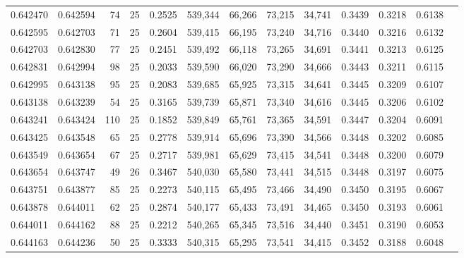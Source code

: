 \begin{tabular}{rrrrrrrrrrrrr}
0.642470 & 0.642594 &    74 &  25 &                                     0.2525 & 539,344 &  66,266 &  73,215 &  34,741 & 0.3439 & 0.3218 & 0.6138 \\
0.642595 & 0.642703 &    71 &  25 &                                     0.2604 & 539,415 &  66,195 &  73,240 &  34,716 & 0.3440 & 0.3216 & 0.6132 \\
0.642703 & 0.642830 &    77 &  25 &                                     0.2451 & 539,492 &  66,118 &  73,265 &  34,691 & 0.3441 & 0.3213 & 0.6125 \\
0.642831 & 0.642994 &    98 &  25 &                                     0.2033 & 539,590 &  66,020 &  73,290 &  34,666 & 0.3443 & 0.3211 & 0.6115 \\
0.642995 & 0.643138 &    95 &  25 &                                     0.2083 & 539,685 &  65,925 &  73,315 &  34,641 & 0.3445 & 0.3209 & 0.6107 \\
0.643138 & 0.643239 &    54 &  25 &                                     0.3165 & 539,739 &  65,871 &  73,340 &  34,616 & 0.3445 & 0.3206 & 0.6102 \\
0.643241 & 0.643424 &   110 &  25 &                                     0.1852 & 539,849 &  65,761 &  73,365 &  34,591 & 0.3447 & 0.3204 & 0.6091 \\
0.643425 & 0.643548 &    65 &  25 &                                     0.2778 & 539,914 &  65,696 &  73,390 &  34,566 & 0.3448 & 0.3202 & 0.6085 \\
0.643549 & 0.643654 &    67 &  25 &                                     0.2717 & 539,981 &  65,629 &  73,415 &  34,541 & 0.3448 & 0.3200 & 0.6079 \\
0.643654 & 0.643747 &    49 &  26 &                                     0.3467 & 540,030 &  65,580 &  73,441 &  34,515 & 0.3448 & 0.3197 & 0.6075 \\
0.643751 & 0.643877 &    85 &  25 &                                     0.2273 & 540,115 &  65,495 &  73,466 &  34,490 & 0.3450 & 0.3195 & 0.6067 \\
0.643878 & 0.644011 &    62 &  25 &                                     0.2874 & 540,177 &  65,433 &  73,491 &  34,465 & 0.3450 & 0.3193 & 0.6061 \\
0.644011 & 0.644162 &    88 &  25 &                                     0.2212 & 540,265 &  65,345 &  73,516 &  34,440 & 0.3451 & 0.3190 & 0.6053 \\
0.644163 & 0.644236 &    50 &  25 &                                     0.3333 & 540,315 &  65,295 &  73,541 &  34,415 & 0.3452 & 0.3188 & 0.6048 \\

\end{tabular}
